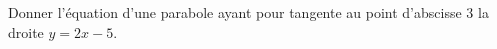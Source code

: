 
\begin{exercice}\label{exosmath-0351}

Donner l'équation d'une parabole ayant pour tangente au point d'abscisse \( 3\) la droite $y=2x-5$.

\end{exercice}
